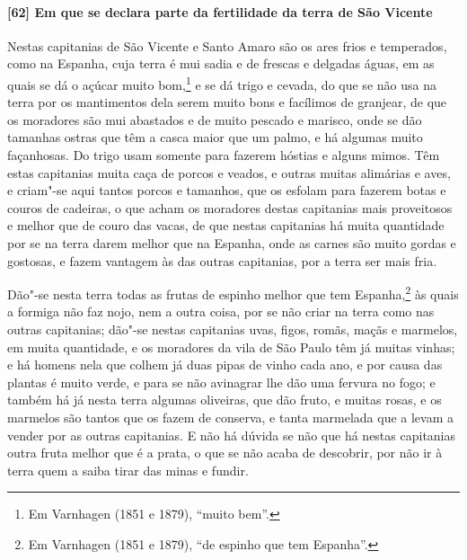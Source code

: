 \begin{linenumbers}
\paragraph{[62] Em que se declara parte da fertilidade da terra de São Vicente} \quad
Nestas capitanias de São Vicente e Santo Amaro são os ares frios e temperados, como na
Espanha, cuja terra é mui sadia e de frescas e delgadas águas, em as quais se dá o açúcar
muito bom,\footnote{ Em Varnhagen (1851 e 1879), ``muito bem''.} e se dá trigo e cevada,
do que se não usa na terra por os mantimentos dela serem muito bons e facílimos de
granjear, de que os moradores são mui abastados e de muito pescado e marisco, onde se dão
tamanhas ostras que têm a casca maior que um palmo, e há algumas muito façanhosas. Do
trigo usam somente para fazerem hóstias e alguns mimos. Têm estas capitanias muita caça de
porcos e veados, e outras muitas alimárias e aves, e criam"-se aqui tantos porcos e
tamanhos, que os esfolam para fazerem botas e couros de cadeiras, o que acham os moradores
destas capitanias mais proveitosos e melhor que de couro das vacas, de que nestas
capitanias há muita quantidade por se na terra darem melhor que na Espanha, onde as carnes
são muito gordas e gostosas, e fazem vantagem às das outras capitanias, por a terra ser
mais fria.

Dão"-se nesta terra todas as frutas de espinho melhor que tem Espanha,\footnote{ Em
Varnhagen (1851 e 1879), ``de espinho que tem Espanha''.} às quais a formiga não faz nojo,
nem a outra coisa, por se não criar na terra como nas outras capitanias; dão"-se nestas
capitanias uvas, figos, romãs, maçãs e marmelos, em muita quantidade, e os moradores da
vila de São Paulo têm já muitas vinhas; e há homens nela que colhem já duas pipas de vinho
cada ano, e por causa das plantas é muito verde, e para se não avinagrar lhe dão uma
fervura no fogo; e também há já nesta terra algumas oliveiras, que dão fruto, e muitas
rosas, e os marmelos são tantos que os fazem de conserva, e tanta marmelada que a levam a
vender por as outras capitanias. E não há dúvida se não que há nestas capitanias outra
fruta melhor que é a prata, o que se não acaba de descobrir, por não ir à terra quem a
saiba tirar das minas e fundir.


\end{linenumbers}
